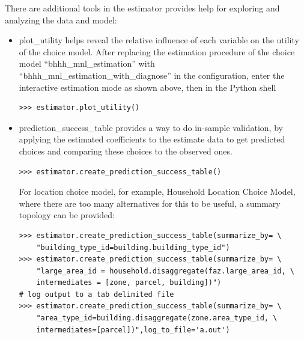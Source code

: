 There are additional tools in the estimator provides help
for exploring and analyzing the data and model:
\begin{itemize}
\item plot_utility helps reveal the relative influence of
  each variable on the utility of the choice model. After
  replacing the estimation procedure of the choice model
  ``bhhh_mnl_estimation'' with
  ``bhhh_mnl_estimation_with_diagnose'' in the
  configuration, enter the interactive estimation mode as
  shown above, then in the Python shell
\begin{verbatim}
>>> estimator.plot_utility()
\end{verbatim}
\item prediction_success_table provides a way to do
  in-sample validation, by applying the estimated
  coefficients to the estimate data to get predicted choices
  and comparing these choices to the observed ones.
\begin{verbatim}
>>> estimator.create_prediction_success_table()
\end{verbatim}
  For location choice model, for example, Household Location
  Choice Model, where there are too many alternatives for
  this to be useful, a summary topology can be provided:
\begin{verbatim}
>>> estimator.create_prediction_success_table(summarize_by= \
    "building_type_id=building.building_type_id")
>>> estimator.create_prediction_success_table(summarize_by= \
    "large_area_id = household.disaggregate(faz.large_area_id, \
    intermediates = [zone, parcel, building])")
# log output to a tab delimited file
>>> estimator.create_prediction_success_table(summarize_by= \
    "area_type_id=building.disaggregate(zone.area_type_id, \
    intermediates=[parcel])",log_to_file='a.out')
\end{verbatim}

\end{itemize}

